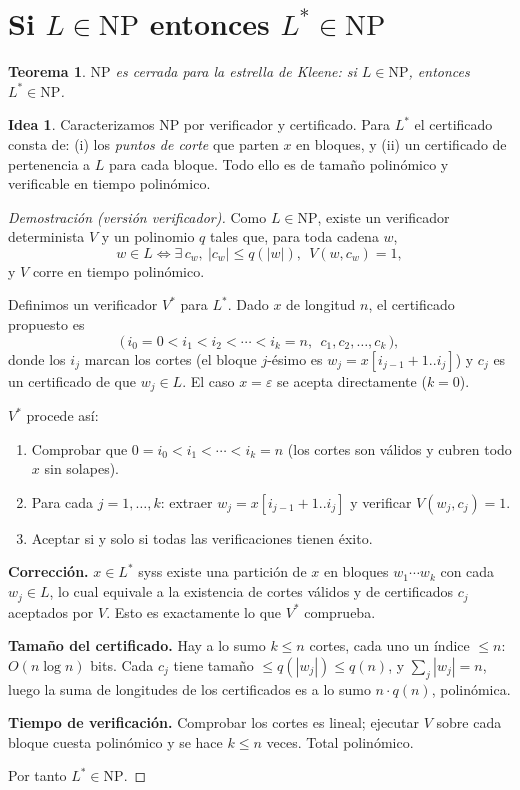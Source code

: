 \documentclass[11pt,a4paper]{article}
\theoremstyle{plain}
\newtheorem{teorema}{Teorema}
\theoremstyle{definition}
\newtheorem*{idea}{Idea}
\newcommand{\NP}{\mathrm{NP}}
\newcommand{\Lstar}{L^{*}}
\begin{document}
\section{Si $L\in\NP$ entonces $\Lstar\in\NP$}

\begin{teorema}
$\NP$ es cerrada para la estrella de Kleene: si $L\in\NP$, entonces $\Lstar\in\NP$.
\end{teorema}

\begin{idea}
Caracterizamos $\NP$ por verificador y certificado. Para $\Lstar$ el certificado
consta de: (i) los \emph{puntos de corte} que parten $x$ en bloques, y (ii) un
certificado de pertenencia a $L$ para cada bloque. Todo ello es de tama\~no
polin\'omico y verificable en tiempo polin\'omico.
\end{idea}

\begin{proof}[Demostraci\'on (versi\'on verificador)]
Como $L\in\NP$, existe un verificador determinista $V$ y un polinomio $q$ tales que,
para toda cadena $w$,
\[
w\in L \iff \exists\, c_w,\ |c_w|\le q(|w|),\ \ V(w,c_w)=1,
\]
y $V$ corre en tiempo polin\'omico.

Definimos un verificador $V^{*}$ para $\Lstar$. Dado $x$ de longitud $n$, el
certificado propuesto es
\[
\big(\, i_0=0 < i_1 < i_2 < \cdots < i_k = n,\ \ c_1, c_2,\dots, c_k \,\big),
\]
donde los $i_j$ marcan los cortes (el bloque $j$-\'esimo es $w_j=x[i_{j-1}+1..i_j]$)
y $c_j$ es un certificado de que $w_j\in L$. El caso $x=\varepsilon$ se acepta
directamente ($k=0$).

$V^{*}$ procede as\'i:
\begin{enumerate}[nosep]
  \item Comprobar que $0=i_0<i_1<\cdots<i_k=n$ (los cortes son v\'alidos y cubren
        todo $x$ sin solapes).
  \item Para cada $j=1,\dots,k$: extraer $w_j=x[i_{j-1}+1..i_j]$ y verificar
        $V(w_j,c_j)=1$.
  \item Aceptar si y solo si todas las verificaciones tienen \'exito.
\end{enumerate}

\textbf{Correcci\'on.} $x\in\Lstar$ syss existe una partici\'on de $x$ en bloques
$w_1\cdots w_k$ con cada $w_j\in L$, lo cual equivale a la existencia de cortes
v\'alidos y de certificados $c_j$ aceptados por $V$. Esto es exactamente lo que
$V^{*}$ comprueba.

\textbf{Tama\~no del certificado.} Hay a lo sumo $k\le n$ cortes, cada uno un \'indice
$\le n$: $O(n\log n)$ bits. Cada $c_j$ tiene tama\~no $\le q(|w_j|)\le q(n)$, y
$\sum_j |w_j|=n$, luego la suma de longitudes de los certificados es a lo sumo
$n\cdot q(n)$, polin\'omica.

\textbf{Tiempo de verificaci\'on.} Comprobar los cortes es lineal; ejecutar $V$
sobre cada bloque cuesta polin\'omico y se hace $k\le n$ veces. Total polin\'omico.

Por tanto $\Lstar\in\NP$.
\end{proof}
\end{document}
